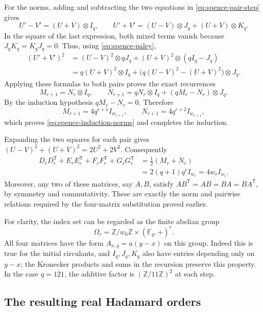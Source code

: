 \documentclass[10pt]{article}
\begin{document}
For the norms, adding and subtracting the two equations in
\eqref{eq:spence-pair-step} gives
\[
 U'-V'=(U+V)\otimes I_q,\qquad
 U'+V'=(U-V)\otimes J_q+(U+V)\otimes K_q.
\]
In the square of the last expression, both mixed terms vanish because
$J_qK_q=K_qJ_q=0$. Thus, using \eqref{eq:spence-paley},
\[
 \begin{split}
 (U'+V')^2
 &=(U-V)^2\otimes qJ_q+(U+V)^2\otimes(qI_q-J_q)\\
 &=q(U+V)^2\otimes I_q+
       \bigl(q(U-V)^2-(U+V)^2\bigr)\otimes J_q.
 \end{split}
\]
Applying these formulas to both pairs proves the exact recurrences
\[
 M_{r+1}=N_r\otimes I_q,\qquad
 N_{r+1}=qN_r\otimes I_q+(qM_r-N_r)\otimes J_q.
\]
By the induction hypothesis $qM_r-N_r=0$. Therefore
\[
 M_{r+1}=4q^{r+1}I_{w_{r+1}},\qquad
 N_{r+1}=4q^{r+2}I_{w_{r+1}},
\]
which proves \eqref{eq:spence-induction-norms} and completes the induction.

Expanding the two squares for each pair gives
$(U-V)^2+(U+V)^2=2U^2+2V^2$. Consequently
\begin{equation}\label{eq:spence-total-norm}
 \begin{split}
 D_rD_r^{\mathsf T}+E_rE_r^{\mathsf T}
   +F_rF_r^{\mathsf T}+G_rG_r^{\mathsf T}
 &=\tfrac12(M_r+N_r)\\
 &=2(q+1)q^rI_{w_r}=4w_rI_{w_r}.
 \end{split}
\end{equation}
Moreover, any two of these matrices, say $A,B$, satisfy
$AB^{\mathsf T}=AB=BA=BA^{\mathsf T}$, by symmetry and commutativity.
These are exactly the norm and pairwise relations required by the
four-matrix substitution proved earlier.

For clarity, the index set can be regarded as the finite abelian group
\[
 \Omega_r=\mathbb Z/w_0\mathbb Z\times(\mathbb F_q,+)^r.
\]
All four matrices have the form $A_{x,y}=a(y-x)$ on this group.
Indeed this is true for the initial circulants, and $I_q,J_q,K_q$ also
have entries depending only on $y-x$; the Kronecker products and sums in
the recursion preserve this property. In the case $q=121$, the additive
factor is $(\mathbb Z/11\mathbb Z)^2$ at each step.

\subsection{The resulting real Hadamard orders}
\end{document}
